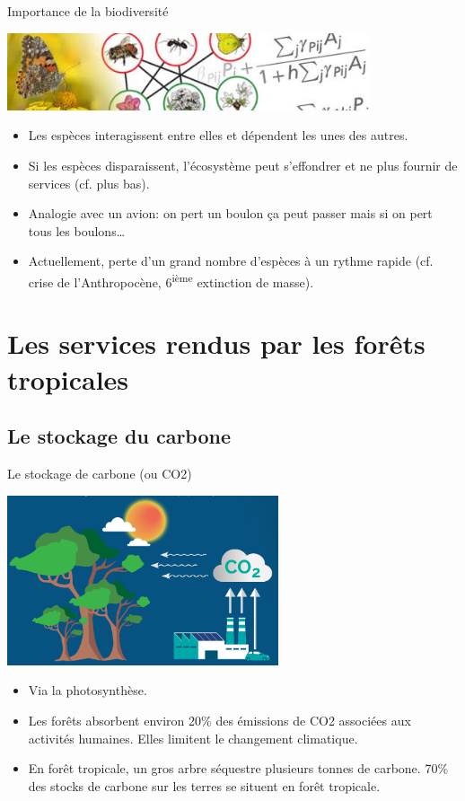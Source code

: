 \documentclass[10pt,table,dvipsnames,compress]{beamer}
\begin{document}
\begin{frame}[label={sec:org60b4b1c}]{Importance de la biodiversité}
\begin{center}
\includegraphics[width=0.8\textwidth]{figs/biodiversity-network.jpg}
\end{center}

\begin{itemize}
\item Les espèces interagissent entre elles et dépendent les unes des autres.
\item Si les espèces disparaissent, l'écosystème peut s'effondrer et ne plus fournir de services (cf. plus bas).
\item Analogie avec un avion: on pert un boulon ça peut passer mais si on pert tous les boulons\ldots{}
\item Actuellement, perte d'un grand nombre d'espèces à un rythme rapide (cf. crise de l'Anthropocène, 6\textsuperscript{ième} extinction de masse).
\end{itemize}
\end{frame}
\section{Les services rendus par les forêts tropicales}
\label{sec:org60e1a0b}

\subsection{Le stockage du carbone}
\label{sec:org681c1f8}

\begin{frame}[label={sec:org32c4e70}]{Le stockage de carbone (ou CO2)}
\begin{center}
\includegraphics[width=0.6\textwidth]{figs/carbon-sequestration-by-forests.png}
\end{center}

\begin{itemize}
\item Via la photosynthèse.
\item Les forêts absorbent environ 20\% des émissions de CO2 associées aux activités humaines. Elles limitent le changement climatique.
\item En forêt tropicale, un gros arbre séquestre plusieurs tonnes de carbone. 70\% des stocks de carbone sur les terres se situent en forêt tropicale.
\end{itemize}
\end{frame}
\end{document}
